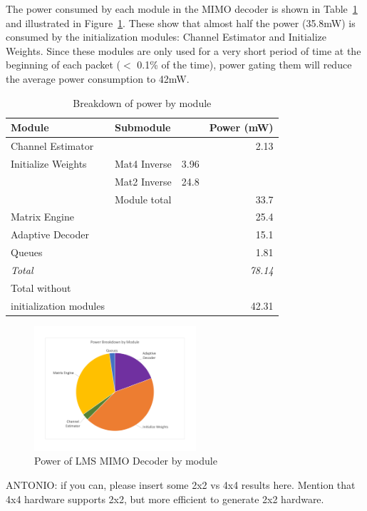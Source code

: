 \documentclass[journal]{IEEEtran}
\begin{document}
The power consumed by each module in the MIMO decoder is shown in Table~\ref{power_breakdown_table} and illustrated in Figure~\ref{power_breakdown_module}. These show that almost half the power (35.8mW) is consumed by the initialization modules: Channel Estimator and Initialize Weights. Since these modules are only used for a very short period of time at the beginning of each packet ($<$ 0.1\% of the time), power gating them will reduce the average power consumption to 42mW.

\begin{table}[!h]
\caption{Breakdown of power by module}
\label{power_breakdown_table}
\centering
\begin{tabular}{l l l r}
\hline
Module & Submodule & & Power (mW) \\
\hline
Channel Estimator & & & 2.13 \\
Initialize Weights & Mat4 Inverse & 3.96 & \\
 & Mat2 Inverse & 24.8 & \\
 & Module total & & 33.7 \\
Matrix Engine & & & 25.4 \\
Adaptive Decoder & & & 15.1 \\
Queues & & & 1.81 \\
\hline
\em{Total} & & & \em{78.14} \\
Total without & & & \\
initialization modules & & & 42.31 \\
\hline
\end{tabular}
\end{table}

\begin{figure}[!h]
\centering
\includegraphics*[width=6cm, viewport = 90 100 660 540]{images/power_breakdown_module.pdf}
\caption{Power of LMS MIMO Decoder by module}
\label{power_breakdown_module}
\end{figure}

ANTONIO: if you can, please insert some 2x2 vs 4x4 results here. Mention that 4x4 hardware supports 2x2, but more efficient to generate 2x2 hardware.
\end{document}
